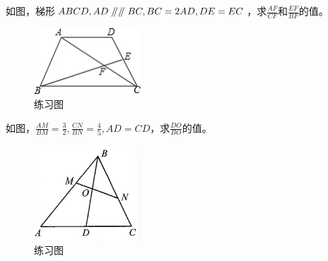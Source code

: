 \documentclass{ecnuthesis}
\newcommand\px{\mathrel{/\mkern-5mu/}}  %
\begin{document}
\begin{problem}
    如图，梯形$ABCD,AD\px \px BC,BC=2AD,DE=EC$，求$\frac{AF}{CF}$和$\frac{EF}{BF}$的值。\\
\end{problem}
\begin{figure}[H]
\centering
\includegraphics[width=4cm]{picture/853.png}
\caption{练习图}
\end{figure}
\begin{problem}
    如图，$\frac{AM}{BM}=\frac{3}{2},\frac{CN}{BN}=\frac{4}{5},AD=CD$，求$\frac{DO}{BO}$的值。\\
\end{problem}
\begin{figure}[H]
\centering
\includegraphics[width=4cm]{picture/852.png}
\caption{练习图}
\end{figure}
\clearpage
\end{document}
